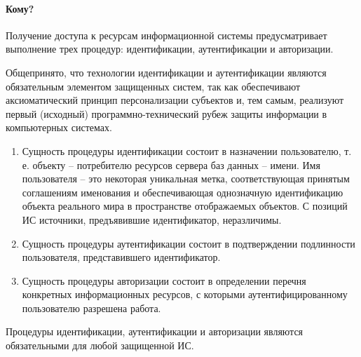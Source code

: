 \paragraph{Кому?}

Получение доступа к ресурсам информационной системы предусматривает выполнение трех процедур: идентификации, аутентификации и авторизации.

Общепринято, что технологии идентификации и аутентификации являются обязательным элементом защищенных систем, так как обеспечивают аксиоматический принцип персонализации субъектов и, тем самым, реализуют первый (исходный) программ­но-технический рубеж защиты информации в компьютерных системах.

\begin{enumerate}
	\item Сущность процедуры идентификации состоит в назначении пользователю, т. е. объекту -- потребителю ресурсов сервера баз данных -- имени. Имя пользователя -- это некоторая уникальная метка, соответствующая принятым соглашениям именования и обеспечивающая однозначную идентификацию объекта реального мира в пространстве отображаемых объектов. С позиций ИС источники, предъявившие идентификатор, неразличимы.
	\item Сущность процедуры аутентификации состоит в подтверждении подлинности пользователя, представившего идентификатор.
	\item Сущность процедуры авторизации состоит в определении перечня конкретных информационных ресурсов, с которыми аутентифицированному пользователю разрешена работа.

\end{enumerate}
Процедуры идентификации, аутентификации и авторизации являются обязательными для любой защищенной ИС.

